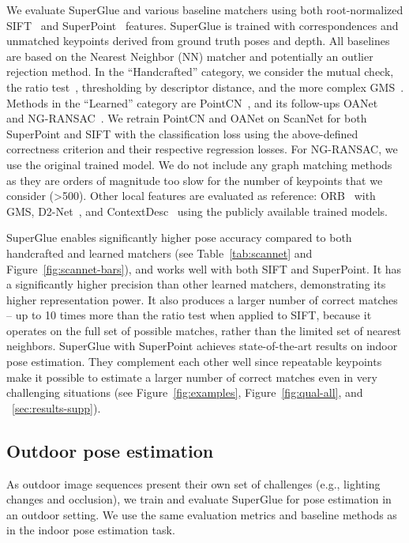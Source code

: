 \documentclass[10pt,twocolumn,letterpaper]{article}
\newcommand{\PAR}[1]{\vskip4pt \noindent{\bf #1~}}
\renewcommand{\*}[1]{\mathbf{#1}}
\newcommand{\0}{\phantom{0}}
\begin{document}
\PAR{Baselines:} We evaluate SuperGlue and various baseline matchers using both root-normalized SIFT~\cite{lowe2004distinctive, arandjelovic2012three} and SuperPoint~\cite{superpoint} features.
SuperGlue is trained with correspondences and unmatched keypoints derived from ground truth poses and depth.
All baselines are based on the Nearest Neighbor (NN) matcher and potentially an outlier rejection method. In the ``Handcrafted'' category, we consider the mutual check, the ratio test~\cite{lowe2004distinctive}, thresholding by descriptor distance, and the more complex GMS~\cite{bian2017gms}. Methods in the ``Learned'' category are PointCN~\cite{moo2018learning}, and its follow-ups OANet~\cite{zhang2019learning} and NG-RANSAC~\cite{brachmann2019neural}. We retrain PointCN and OANet on ScanNet for both SuperPoint and SIFT with the classification loss using the above-defined correctness criterion and their respective regression losses. For NG-RANSAC, we use the original trained model.
We do not include any graph matching methods as they are orders of magnitude too slow for the number of keypoints that we consider (\textgreater 500). Other local features are evaluated as reference: ORB~\cite{rublee2011orb} with GMS, D2-Net~\cite{dusmanu2019d2}, and ContextDesc~\cite{luo2019contextdesc} using the publicly available trained models.

\PAR{Results:} SuperGlue enables significantly higher pose accuracy compared to both handcrafted and learned matchers (see Table~\ref{tab:scannet} and Figure~\ref{fig:scannet-bars}), and works well with both SIFT and SuperPoint. It has a significantly higher precision than other learned matchers, demonstrating its higher representation power. It also produces a larger number of correct matches -- up to 10 times more than the ratio test when applied to SIFT, because it operates on the full set of possible matches, rather than the limited set of nearest neighbors.
SuperGlue with SuperPoint achieves state-of-the-art results on indoor pose estimation. They complement each other well since repeatable keypoints make it possible to estimate a larger number of correct matches even in very challenging situations (see Figure~\ref{fig:examples}, Figure~\ref{fig:qual-all}, and \supp~\ref{sec:results-supp}).

\subsection{Outdoor pose estimation}
\label{sec:outdoor}
As outdoor image sequences present their own set of challenges (e.g., lighting changes and occlusion), we train and evaluate SuperGlue for pose estimation in an outdoor setting. We use the same evaluation metrics and baseline methods as in the indoor pose estimation task.
\end{document}
